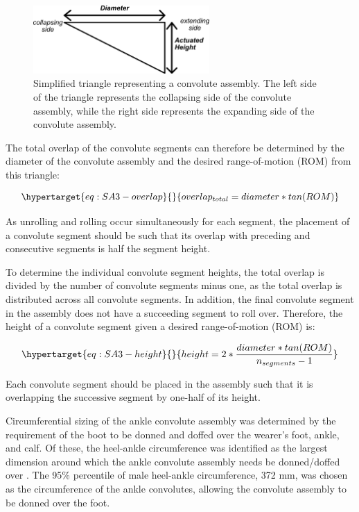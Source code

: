 \documentclass[defaultstyle,11pt]{thesis}
\begin{document}
\hypertarget{fig:SA3-convolute_tri}{%
\begin{figure}
\centering
\includegraphics[width=0.6\textwidth,height=\textheight]{../fig/SA3/Convolute_Triangle.png}
\caption[{Simplified triangle representing a convolute assembly.}]{Simplified triangle representing a convolute assembly. The left side of the triangle represents the collapsing side of the convolute assembly, while the right side represents the expanding side of the convolute assembly.}
\label{fig:SA3-convolute_tri}
\end{figure}
}

The total overlap of the convolute segments can therefore be determined by the diameter of the convolute assembly and the desired range-of-motion (ROM) from this triangle:

\begin{equation}\protect\hypertarget{eq:SA3-overlap}{}{
overlap_{total} = diameter*tan(ROM)
}\label{eq:SA3-overlap}\end{equation}

As unrolling and rolling occur simultaneously for each segment, the placement of a convolute segment should be such that its overlap with preceding and consecutive segments is half the segment height.

To determine the individual convolute segment heights, the total overlap is divided by the number of convolute segments minus one, as the total overlap is distributed across all convolute segments.
In addition, the final convolute segment in the assembly does not have a succeeding segment to roll over.
Therefore, the height of a convolute segment given a desired range-of-motion (ROM) is:

\begin{equation}\protect\hypertarget{eq:SA3-height}{}{
height = 2*\frac{diameter * tan(ROM)}{n_{segments}-1}
}\label{eq:SA3-height}\end{equation}

Each convolute segment should be placed in the assembly such that it is overlapping the successive segment by one-half of its height.

Circumferential sizing of the ankle convolute assembly was determined by the requirement of the boot to be donned and doffed over the wearer's foot, ankle, and calf.
Of these, the heel-ankle circumference was identified as the largest dimension around which the ankle convolute assembly needs be donned/doffed over \citep{Gordon2014}.
The 95\% percentile of male heel-ankle circumference, 372 mm, was chosen as the circumference of the ankle convolutes, allowing the convolute assembly to be donned over the foot.
\end{document}
